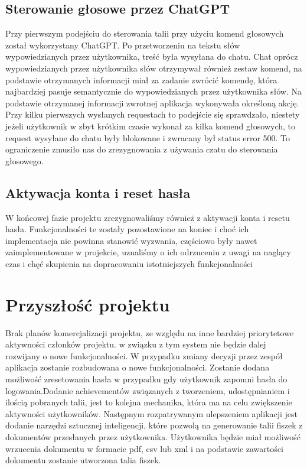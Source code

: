 \subsection{Sterowanie głosowe przez ChatGPT}
Przy pierwszym podejściu do sterowania talii przy użyciu komend głosowych został wykorzystany ChatGPT. Po przetworzeniu na tekstu słów wypowiedzianych przez użytkownika, treść była wysyłana do chatu. Chat oprócz wypowiedzianych przez użytkownika słów otrzymywał również zestaw komend, na podstawie otrzymanych informacji miał za zadanie zwrócić komendę, która najbardziej pasuje semantycznie do wypowiedzianych przez użytkownika słów. Na podstawie otrzymanej informacji zwrotnej aplikacja wykonywała określoną akcję. Przy kilku pierwszych wysłanych requestach to podejście się sprawdzało, niestety jeżeli użytkownik w zbyt krótkim czasie wykonał za kilka komend głosowych, to request wysyłane do chatu były blokowane i zwracany był status error 500. To ograniczenie zmusiło nas do zrezygnowania z używania czatu do sterowania głosowego.

\subsection{Aktywacja konta i reset hasła}
W końcowej fazie projektu zrezygnowaliśmy również z aktywacji konta i resetu hasła. Funkcjonalności te zostały pozostawione na koniec i choć ich implementacja nie powinna stanowić wyzwania, częściowo były nawet zaimplementowane w projekcie,  uznaliśmy o ich odrzuceniu z uwagi na naglący czas i chęć skupienia na dopracowaniu istotniejszych funkcjonalności


\section{Przyszłość projektu}

Brak planów komercjalizacji projektu, ze względu na inne bardziej priorytetowe aktywności członków projektu. w związku z tym system nie będzie dalej rozwijany  o nowe funkcjonalności. W przypadku zmiany decyzji przez zespół aplikacja zostanie rozbudowana o nowe funkcjonalności. Zostanie dodana możliwość zresetowania hasła w przypadku gdy użytkownik zapomni hasła do logowania.Dodanie achievementów związanych z tworzeniem, udostępnianiem i ilością pobranych talii,  jest to kolejna mechanika, która ma na celu zwiększenie aktywności użytkowników. Następnym rozpatrywanym ulepszeniem aplikacji jest dodanie narzędzi sztucznej inteligencji, które pozwolą na  generowanie talii fiszek z dokumentów przesłanych przez użytkownika. Użytkownika będzie miał możliwość wrzucenia dokumentu w formacie pdf, csv lub xml  i na podstawie zawartości dokumentu zostanie utworzona talia fiszek.